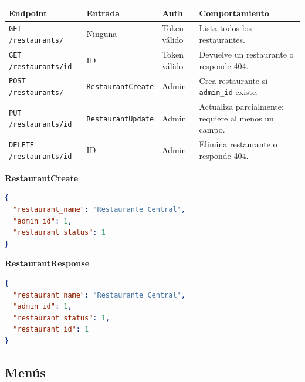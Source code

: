 \documentclass[12pt,letterpaper]{article}
\def\endpoint#1#2{\texttt{#1 #2}}
\def\codefile#1{\nolinkurl{#1}}
\begin{document}
\small
\renewcommand{\arraystretch}{1.25}

\begin{tabularx}{\textwidth}{
>{\raggedright\arraybackslash}p{}
>{\raggedright\arraybackslash}p{}
>{\raggedright\arraybackslash}p{}
>{\raggedright\arraybackslash}X
}
\toprule
\textbf{Endpoint} & \textbf{Entrada} & \textbf{Auth} & \textbf{Comportamiento}\\
\midrule

\endpoint{GET}{/restaurants/}
& Ninguna
& Token válido
& Lista todos los restaurantes.\\

\endpoint{GET}{/restaurants/{id}}
& ID
& Token válido
& Devuelve un restaurante o responde 404.\\

\endpoint{POST}{/restaurants/}
& \codefile{RestaurantCreate}
& Admin
& Crea restaurante si \codefile{admin_id} existe.\\

\endpoint{PUT}{/restaurants/{id}}
& \codefile{RestaurantUpdate}
& Admin
& Actualiza parcialmente; requiere al menos un campo.\\

\endpoint{DELETE}{/restaurants/{id}}
& ID
& Admin
& Elimina restaurante o responde 404.\\

\bottomrule
\end{tabularx}

\normalsize
\renewcommand{\arraystretch}{1}

\vspace{0.6cm}

\textbf{RestaurantCreate}
\begin{lstlisting}[language=json]
{
  "restaurant_name": "Restaurante Central",
  "admin_id": 1,
  "restaurant_status": 1
}
\end{lstlisting}

\textbf{RestaurantResponse}
\begin{lstlisting}[language=json]
{
  "restaurant_name": "Restaurante Central",
  "admin_id": 1,
  "restaurant_status": 1,
  "restaurant_id": 1
}
\end{lstlisting}

\subsection{Menús}
\end{document}
